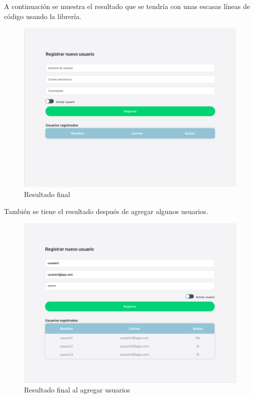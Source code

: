 A continuación se muestra el resultado que se tendría con unas escasas líneas de código usando la librería.
\newline
\begin{figure}[H]
    \includegraphics[width=1\textwidth]{./Imagenes/9.10}
   \centering 
    \caption[Resultado final]{Resultado final}
    \end{figure}
\newline
También se tiene el resultado después de agregar algunos usuarios.
\newline
\begin{figure}[H]
    \includegraphics[width=1\textwidth]{./Imagenes/9.11}
   \centering 
    \caption[Resultado final al agregar usuarios]{Resultado final al agregar usuarios}
    \end{figure}
\newline

